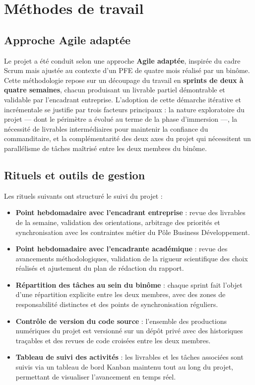 \documentclass[../main.tex]{subfiles}
\begin{document}
\section{Méthodes de travail}

\subsection{Approche Agile adaptée}

Le projet a été conduit selon une approche \textbf{Agile adaptée}, inspirée du cadre Scrum mais ajustée au contexte d'un PFE de quatre mois réalisé par un binôme. Cette méthodologie repose sur un découpage du travail en \textbf{sprints de deux à quatre semaines}, chacun produisant un livrable partiel démontrable et validable par l'encadrant entreprise. L'adoption de cette démarche itérative et incrémentale se justifie par trois facteurs principaux : la nature exploratoire du projet --- dont le périmètre a évolué au terme de la phase d'immersion ---, la nécessité de livrables intermédiaires pour maintenir la confiance du commanditaire, et la complémentarité des deux axes du projet qui nécessitent un parallélisme de tâches maîtrisé entre les deux membres du binôme.

\subsection{Rituels et outils de gestion}

Les rituels suivants ont structuré le suivi du projet :

\begin{itemize}[leftmargin=1.5cm, itemsep=4pt]
  \item \textbf{Point hebdomadaire avec l'encadrant entreprise} : revue des livrables de la semaine, validation des orientations, arbitrage des priorités et synchronisation avec les contraintes métier du Pôle Business Développement.
  \item \textbf{Point hebdomadaire avec l'encadrante académique} : revue des avancements méthodologiques, validation de la rigueur scientifique des choix réalisés et ajustement du plan de rédaction du rapport.
  \item \textbf{Répartition des tâches au sein du binôme} : chaque sprint fait l'objet d'une répartition explicite entre les deux membres, avec des zones de responsabilité distinctes et des points de synchronisation réguliers.
  \item \textbf{Contrôle de version du code source} : l'ensemble des productions numériques du projet est versionné sur un dépôt privé avec des historiques traçables et des revues de code croisées entre les deux membres.
  \item \textbf{Tableau de suivi des activités} : les livrables et les tâches associées sont suivis via un tableau de bord Kanban maintenu tout au long du projet, permettant de visualiser l'avancement en temps réel.
\end{itemize}
\end{document}
